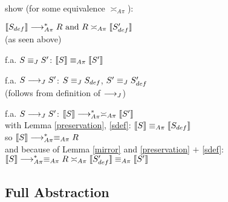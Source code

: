 show (for some equivalence $\asymp_{A\pi}$):

\begin{lemma} \label{mirror}
  $ \llbracket S_{def} \rrbracket \overset{}{\longrightarrow}_{A\pi}^* R \text{ and } R \asymp_{A\pi} \llbracket S_{def}' \rrbracket $
  \\
  (as seen above)
\end{lemma}

\begin{lemma} \label{preservation}
  f.a.
  $ S \equiv_{J} S' $:
  $ \llbracket S \rrbracket \equiv_{A\pi} \llbracket S' \rrbracket $
\end{lemma}

\begin{lemma} \label{sdef}
  f.a.
  $ S \longrightarrow_J S'$:
  $ S  \equiv_{J} S_{def} $,
  $ S' \equiv_{J} S_{def}' $
  \\
  (follows from definition of $\longrightarrow_J$)
\end{lemma}

\begin{theorem}[Completeness]
  f.a.
  $ S \longrightarrow_J S' $:
  $ \llbracket S \rrbracket \overset{}{\longrightarrow}_{A\pi}^* \asymp_{A\pi} \llbracket S' \rrbracket $
  \\
  with Lemma \ref{preservation}, \ref{sdef}: $ \llbracket S \rrbracket \equiv_{A\pi} \llbracket S_{def} \rrbracket $
  \\
  so $\llbracket S \rrbracket \overset{}{\longrightarrow}_{A\pi}^* \equiv_{A\pi} R$
  \\
  and because of Lemma \ref{mirror} and \ref{preservation} $+$ \ref{sdef}:
  $\llbracket S \rrbracket \overset{}{\longrightarrow}_{A\pi}^* \equiv_{A\pi} R \asymp_{A\pi} \llbracket S_{def}' \rrbracket \equiv_{A\pi} \llbracket S' \rrbracket$
\end{theorem}



\subsection{Full Abstraction}

